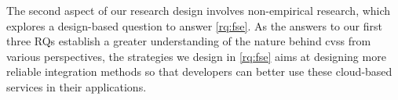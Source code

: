 The second aspect of our research design involves non-empirical research, which explores a design-based question \citep{Simon:1996uw} to answer \ref{rq:fse}. As the answers to our first three RQs establish a greater understanding of the nature behind \glspl{cvs} from various perspectives, the strategies we design in \ref{rq:fse} aims at designing more reliable integration methods so that developers can better use these cloud-based services in their applications.
%
%

